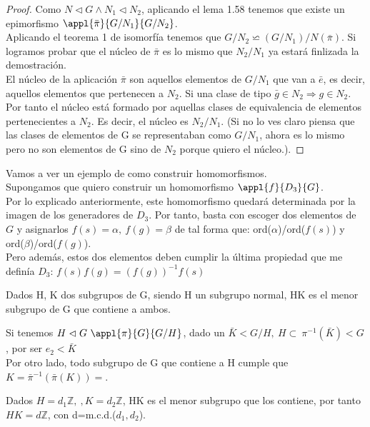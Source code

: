\documentclass{apuntes}
\begin{document}
\begin{proof}
 Como $N\vartriangleleft G  \wedge  N_1 \lhd N_2$, aplicando el lema 1.58 tenemos que existe un epimorfismo $\appl{\bar{\pi}}{G/N_1}{G/N_2}$.\\
 Aplicando el teorema 1 de isomorfía tenemos que $G/N_2 \backsimeq (G/N_1)/N(\bar{\pi})$. Si logramos probar que el núcleo de $\bar{\pi}$ 
 es lo mismo que $N_2/N_1$  ya estará finlizada la demostración.\\
 El núcleo de la aplicación $\bar{\pi}$  son aquellos elementos de $G/N_1$  que van a $\bar{e}$, es decir, aquellos elementos que pertenecen a $N_2$.
 Si una clase de tipo $\bar{g}\in N_2 \Rightarrow g \in N_2$. Por tanto el núcleo está formado por aquellas clases de equivalencia de elementos pertenecientes a $N_2$.
 Es decir, el núcleo es $N_2/N_1$. (Si no lo ves claro piensa que las clases de elementos de G se representaban como $G/N_1$, ahora es lo mismo pero
 no son elementos de G sino de $N_2$  porque quiero el núcleo.).
\end{proof}

\begin{example}
 Vamos a ver un ejemplo de como construir homomorfismos.\\
 Supongamos que quiero construir un homomorfismo $\appl{f}{D_3}{G}$.\\
 Por lo explicado anteriormente, este homomorfismo quedará determinada por la imagen de los generadores de $D_3$. Por tanto,
 basta con escoger dos elementos de $G$  y asignarlos $f(s)=\alpha, \ f(g)=\beta$  de tal forma que: ord($\alpha$)/ord($f(s)$) y ord($\beta$)/ord($f(g)$).\\
 Pero además, estos dos elementos deben cumplir la última propiedad que me definía $D_3$: $f(s)f(g)=(f(g))^{-1}f(s)$
\end{example}

\begin{defn}
Dados H, K dos subgrupos de G, siendo H un subgrupo normal, HK es el menor subgrupo de G que contiene a ambos.
\end{defn}
 Si tenemos $H \vartriangleleft G \ \appl{\pi}{G}{G/H}$, dado un $\bar{K} < G/H, \  H \subset \ \pi^{-1}(\bar{K}) < G $, por ser $e_2 < \bar{K}$\\
 Por otro lado, todo subgrupo de G que contiene a H cumple que $K=\bar{\pi}^{-1}(\bar{\pi}(K))=$.
 
 \begin{example}
  Dados $H=d_1\mathbb{Z}, \ , K=d_2\mathbb{Z}$, HK es el menor subgrupo que los contiene, por tanto $HK=d\mathbb{Z}$, con d=m.c.d.($d_1, d_2$).
 \end{example}
\end{document}
